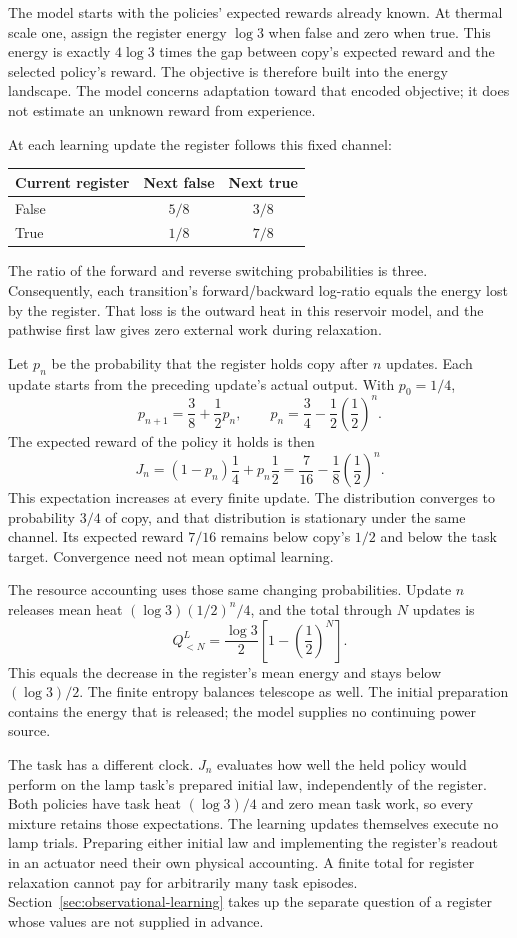 \documentclass[11pt]{article}
\begin{document}
The model starts with the policies' expected rewards already known. At thermal
scale one, assign the register energy $\log3$ when false and zero when true.
This energy is exactly $4\log3$ times the gap between copy's expected reward
and the selected policy's reward. The objective is therefore built into the
energy landscape. The model concerns adaptation toward that encoded
objective; it does not estimate an unknown reward from experience.

At each learning update the register follows this fixed channel:
\begin{center}
\begin{tabular}{lcc}
\hline
Current register & Next false & Next true \\
\hline
False & $5/8$ & $3/8$ \\
True & $1/8$ & $7/8$ \\
\hline
\end{tabular}
\end{center}
The ratio of the forward and reverse switching probabilities is three.
Consequently, each transition's forward/backward log-ratio equals the energy
lost by the register. That loss is the outward heat in this reservoir model,
and the pathwise first law gives zero external work during relaxation.

Let $p_n$ be the probability that the register holds copy after $n$ updates.
Each update starts from the preceding update's actual output. With $p_0=1/4$,
\[
 p_{n+1}=\frac38+\frac12p_n,
 \qquad p_n=\frac34-\frac12\left(\frac12\right)^n.
\]
The expected reward of the policy it holds is then
\[
 J_n=(1-p_n)\frac14+p_n\frac12
 =\frac7{16}-\frac18\left(\frac12\right)^n.
\]
This expectation increases at every finite update. The distribution converges
to probability $3/4$ of copy, and that distribution is stationary under the
same channel. Its expected reward $7/16$ remains below copy's $1/2$ and below
the task target. Convergence need not mean optimal learning.

The resource accounting uses those same changing probabilities. Update $n$
releases mean heat $(\log3)(1/2)^n/4$, and the total through $N$ updates is
\[
 Q^L_{<N}=\frac{\log3}{2}\left[1-\left(\frac12\right)^N\right].
\]
This equals the decrease in the register's mean energy and stays below
$(\log3)/2$. The finite entropy balances telescope as well. The initial
preparation contains the energy that is released; the model supplies no
continuing power source.

The task has a different clock. $J_n$ evaluates how well the held policy
would perform on the lamp task's prepared initial law, independently of the
register. Both policies have task heat $(\log3)/4$ and zero mean task work,
so every mixture retains those expectations. The learning updates themselves
execute no lamp trials. Preparing either initial law and implementing the
register's readout in an actuator need their own physical accounting. A finite
total for register relaxation cannot pay for arbitrarily many task episodes.
Section~\ref{sec:observational-learning} takes up the separate question of a
register whose values are not supplied in advance.
\end{document}
